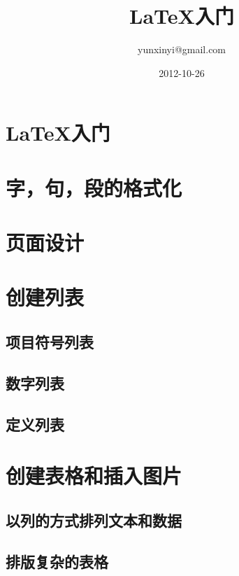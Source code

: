 \documentclass{book}
\title{LaTeX入门}
\author{yunxinyi@gmail.com}
\date{2012-10-26}
\begin{document}
	\maketitle
	\tableofcontents
	\chapter{LaTeX入门}
		
		
		
		
		
	\chapter{字，句，段的格式化}
		
		
		
		
		
		
		
		
	\chapter{页面设计}
		
		
		
\chapter{创建列表}
	\section{项目符号列表}
	\section{数字列表}
	\section{定义列表}
\chapter{创建表格和插入图片}
	\section{以列的方式排列文本和数据}
	\section{排版复杂的表格}
\end{document}
